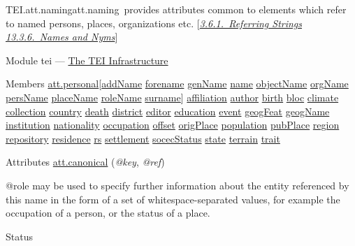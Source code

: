 \begin{reflist}
\item[]\begin{specHead}{TEI.att.naming}{att.naming} provides attributes common to elements which refer to named persons, places, organizations etc. [\textit{\hyperref[CONARS]{3.6.1.\ Referring Strings}} \textit{\hyperref[NDNYM]{13.3.6.\ Names and Nyms}}]\end{specHead} 
    \item[{Module}]
  tei — \hyperref[ST]{The TEI Infrastructure}
    \item[{Members}]
  \hyperref[TEI.att.personal]{att.personal}[\hyperref[TEI.addName]{addName} \hyperref[TEI.forename]{forename} \hyperref[TEI.genName]{genName} \hyperref[TEI.name]{name} \hyperref[TEI.objectName]{objectName} \hyperref[TEI.orgName]{orgName} \hyperref[TEI.persName]{persName} \hyperref[TEI.placeName]{placeName} \hyperref[TEI.roleName]{roleName} \hyperref[TEI.surname]{surname}] \hyperref[TEI.affiliation]{affiliation} \hyperref[TEI.author]{author} \hyperref[TEI.birth]{birth} \hyperref[TEI.bloc]{bloc} \hyperref[TEI.climate]{climate} \hyperref[TEI.collection]{collection} \hyperref[TEI.country]{country} \hyperref[TEI.death]{death} \hyperref[TEI.district]{district} \hyperref[TEI.editor]{editor} \hyperref[TEI.education]{education} \hyperref[TEI.event]{event} \hyperref[TEI.geogFeat]{geogFeat} \hyperref[TEI.geogName]{geogName} \hyperref[TEI.institution]{institution} \hyperref[TEI.nationality]{nationality} \hyperref[TEI.occupation]{occupation} \hyperref[TEI.offset]{offset} \hyperref[TEI.origPlace]{origPlace} \hyperref[TEI.population]{population} \hyperref[TEI.pubPlace]{pubPlace} \hyperref[TEI.region]{region} \hyperref[TEI.repository]{repository} \hyperref[TEI.residence]{residence} \hyperref[TEI.rs]{rs} \hyperref[TEI.settlement]{settlement} \hyperref[TEI.socecStatus]{socecStatus} \hyperref[TEI.state]{state} \hyperref[TEI.terrain]{terrain} \hyperref[TEI.trait]{trait}
    \item[{Attributes}]
  \hyperref[TEI.att.canonical]{att.canonical} (\textit{@key}, \textit{@ref}) \hfil\\[-10pt]\begin{sansreflist}
    \item[@role]
  may be used to specify further information about the entity referenced by this name in the form of a set of whitespace-separated values, for example the occupation of a person, or the status of a place.
\begin{reflist}
    \item[{Status}]

\end{reflist}
\end{sansreflist}
\end{reflist}
